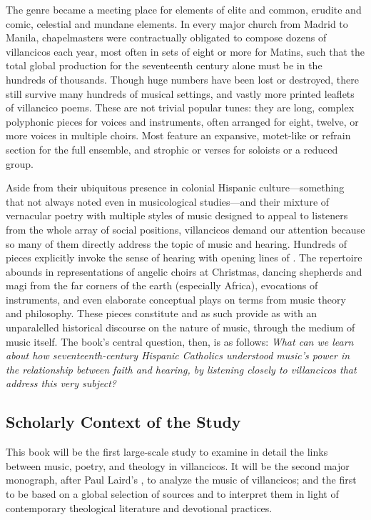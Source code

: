 \documentclass{vcbook-proposal}
\begin{document}
The genre became a meeting place for elements of elite and common, erudite and comic, celestial and mundane elements.
In every major church from Madrid to Manila, chapelmasters were contractually obligated to compose dozens of villancicos each year, most often in sets of eight or more for Matins, such that the total global production for the seventeenth century alone must be in the hundreds of thousands.
Though huge numbers have been lost or destroyed, there still survive many hundreds of musical settings, and vastly more printed leaflets of villancico poems. 
These are not trivial popular tunes: they are long, complex polyphonic pieces for voices and instruments, often arranged for eight, twelve, or more voices in multiple choirs.
Most feature an expansive, motet-like  or refrain section for the full ensemble, and strophic  or verses for soloists or a reduced group.

Aside from their ubiquitous presence in colonial Hispanic culture---something that not always noted even in musicological studies---and their mixture of vernacular poetry with multiple styles of music designed to appeal to listeners from the whole array of social positions, villancicos demand our attention because so many of them directly address the topic of music and hearing.
Hundreds of pieces explicitly invoke the sense of hearing with opening lines of   .
The repertoire abounds in representations of angelic choirs at Christmas, dancing shepherds and magi from the far corners of the earth (especially Africa), evocations of instruments, and even elaborate conceptual plays on terms from music theory and philosophy.
These pieces constitute  and as such provide as with an unparalelled historical discourse on the nature of music, through the medium of music itself.
The book's central question, then, is as follows: 
\emph{What can we learn about how seventeenth-century Hispanic Catholics understood music's power in the relationship between faith and hearing, by listening closely to villancicos that address this very subject?}

\subsection{Scholarly Context of the Study}

This book will be the first large-scale study to examine in detail the links between music, poetry, and theology in villancicos.
It will be the second major monograph, after Paul Laird's , to analyze the music of villancicos; and the first to be based on a global selection of sources and to interpret them in light of contemporary theological literature and devotional practices.
\end{document}
